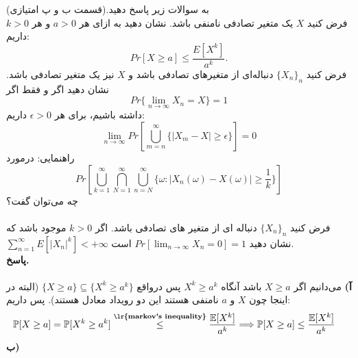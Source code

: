 \problem{}
به سوالات زیر پاسخ دهید.(قسمت ب و پ امتیازی)\\
    \subproblem{}
     فرض کنید \( X \) یک متغیر تصادفی نامنفی باشد. نشان دهید به ازای هر \( a > 0 \) و هر \( k > 0 \) داریم:
    \[
    Pr[X \geq a] \leq \frac{E[X^k]}{a^k}.
    \]
    \subproblem{}
     فرض کنید \( \{X_n\}_n \) دنباله‌ای از متغیرهای تصادفی باشد و \( X \) نیز یک متغیر تصادفی باشد. نشان دهید اگر و فقط اگر 
    \[
    Pr\{\lim_{n \to \infty} X_n = X\} = 1
    \]
    داشته باشیم، برای هر \( \epsilon > 0 \) داریم:
    \[
    \lim_{n \to \infty} Pr[\bigcup_{m=n}^\infty \{|X_m - X| \geq \epsilon\}] = 0
    \]
    راهنمایی: درمورد
    \[
    Pr[\bigcup_{k=1}^\infty \bigcap_{N=1}^\infty \bigcup_{n=N}^\infty \{\omega : |X_n(\omega) - X(\omega)| \geq \frac{1}{k}\}]
    \]
    چه می‌توان گفت؟
    \\\\
    \subproblem{}
    فرض کنید 
    $\{X_n\}_n$
    دنباله ای از متغیر های تصادفی باشد.
    اگر
    $k>0$
    موجود باشد که \\
    $\sum_{n=1}^{\infty}E[|X_n|^k] < +\infty$
    نشان دهید
    $Pr[\lim_{n \to \infty} X_n = 0] = 1$
    است.\\

\textbf{پاسخ.}\\
\\
\textbf{آ)}
می‌دانیم اگر $X\geq a$ باشد آنگاه $X^k\geq a^k$ پس درواقع $\{X\geq a\}\subseteq \{X^k\geq a^k\}$ (البته در اینجا چون $X$ و $a$ نامنفی هستند این دو رویداد معادل هستند). پس داریم:
\[
	\mathbb{P}[X\geq a] = \mathbb{P}[X^k\geq a^k] \overset{\textbf{\lr{markov's inequality}}}{\leq} \frac{\mathbb{E}[X^k]}{a^k} \Longrightarrow \mathbb{P}[X\geq a] \leq \frac{\mathbb{E}[X^k]}{a^k} \quad
\]
\textbf{ب)}

